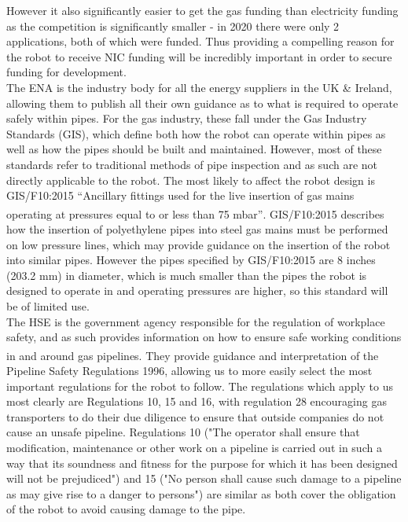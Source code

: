 \documentclass[11pt]{article}		%
\begin{document}
			However it also significantly easier to get the gas funding than electricity funding as the competition is significantly smaller - in 2020 there were only 2 applications, both of which were funded.
			Thus providing a compelling reason for the robot to receive NIC funding will be incredibly important in order to secure funding for development.
			\\
			The ENA is the industry body for all the energy suppliers in the UK \& Ireland, allowing them to publish all their own guidance as to what is required to operate safely within pipes.
			For the gas industry, these fall under the Gas Industry Standards (GIS), which define both how the robot can operate within pipes as well as how the pipes should be built and maintained.
			However, most of these standards refer to traditional methods of pipe inspection and as such are not directly applicable to the robot.
			The most likely to affect the robot design is GIS/F10:2015 “Ancillary fittings used for the live insertion of gas mains operating at pressures equal to or less than 75 mbar”\textsuperscript{\cite{energy2015gas}}.
			GIS/F10:2015 describes how the insertion of polyethylene pipes into steel gas mains must be performed on low pressure lines, which may provide guidance on the insertion of the robot into similar pipes.
			However the pipes specified by 	GIS/F10:2015 are 8 inches (203.2 mm) in diameter, which is much smaller than the pipes the robot is designed to operate in and operating pressures are higher, so this standard will be of limited use.
			\\
			The HSE is the government agency responsible for the regulation of workplace safety, and as such provides information on how to ensure safe working conditions in and around gas pipelines.
			They provide guidance and interpretation\textsuperscript{\cite{books1996guide}} of the Pipeline Safety Regulations 1996, allowing us to more easily select the most important regulations for the robot to follow.
			The regulations which apply to us most clearly are Regulations 10, 15 and 16, with regulation 28 encouraging gas transporters to do their due diligence to ensure that outside companies do not cause an unsafe pipeline.
			Regulations 10 ("The operator shall ensure that modification, maintenance or other work on a pipeline is carried out in such a way that its soundness and fitness for the purpose for which it has been designed will not be prejudiced") and 15 ("No person shall cause such damage to a pipeline as may give rise to a danger to persons") are similar as both cover the obligation of the robot to avoid causing damage to the pipe.
\end{document}

